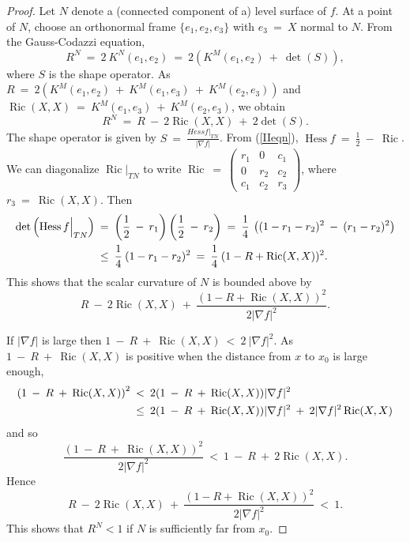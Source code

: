 \documentclass[12pt]{amsart}
\newcommand{\Hess}{\operatorname{Hess}}
\newcommand{\Ric}{\operatorname{Ric}}
\numberwithin{equation}{section}
\theoremstyle{plain}
\theoremstyle{definition}
\theoremstyle{remark}
\begin{document}
\begin{proof}
Let $N$ denote a (connected component of a) 
level surface of $f$. At a point of $N$,
choose an orthonormal frame
$\{e_1, e_2, e_3\}$ with $e_3 \: = \: X$ normal to $N$.
From the Gauss-Codazzi equation, 
\begin{equation}
R^N \: = \: 2 \: K^N(e_1, e_2)
\: = \: 2 (K^M(e_1, e_2) \: + \: \det(S)),
\end{equation}
where $S$ is the shape operator. As
$R \: = \: 2 (K^M(e_1, e_2) \: + \: K^M(e_1, e_3) \: + \:
K^M(e_2, e_3))$ and
$\Ric(X, X) \: = \: K^M(e_1, e_3) \: + \:
K^M(e_2, e_3)$, we obtain
\begin{equation}
R^N \: = \: R \: - \: 2 \Ric(X, X) \: + \: 2 \det(S).
\end{equation}
The shape operator is given by 
$S \: = \: \frac{Hess f |_{TN}}{|\nabla f|}$. 
From (\ref{IIeqn}),
$\Hess f \: = \: \frac{1}{2} \: - \: \Ric$. We can
diagonalize $\Ric \Big|_{TN}$ to write
$\Ric \: = \:
\begin{pmatrix}
r_1 & 0 & c_1 \\
0 & r_2 & c_2 \\
c_1 & c_2 & r_3
\end{pmatrix}$, where $r_3 \: = \: \Ric(X, X)$. Then
\begin{align}
\det \left( \Hess f \Big|_{TN} \right) \: & = \: 
\left( \frac{1}{2} \: - \: r_1 \right) \left( \frac{1}{2} \: - \: r_2 \right)
\: = \: 
\frac{1}{4} \: \left( (1 - r_1 - r_2)^2 \: - \: (r_1 - r_2)^2 \right)
\\
& \le \: \frac{1}{4} \: (1 - r_1 - r_2)^2
\:  = \:
\frac{1}{4} \: (1 - R + \Ric(X, X))^2. \notag
\end{align}
This shows that the scalar curvature of $N$ is bounded above by
\begin{equation}
R \: - \: 2 \Ric(X, X) \: + \: \frac{(1-R+\Ric(X, X))^2}{2|\nabla f|^2}.
\end{equation}

If $|\nabla f|$ is large then
$1 \: - \: R \: + \: \Ric(X, X) \: < \: 2 \: |\nabla f|^2$. 
As $1 \: - \: R \: + \: \Ric(X, X)$ is positive when the
distance from $x$ to $x_0$ is large enough,
\begin{align}
\left( 1 \: - \: R \: + \: \Ric(X, X) \right)^2 \: & < \:
2 (1 \: - \: R \: + \: \Ric(X, X)) |\nabla f|^2 \\
& \le \:
2 (1 \: - \: R \: + \: \Ric(X, X)) |\nabla f|^2 \: + \:
2 |\nabla f|^2 \Ric(X, X) \notag
\end{align}
and so
\begin{equation}
\frac{\left( 1 \: - \: R \: + \: \Ric(X, X) \right)^2}{2|\nabla f|^2}
 \: < \:
1 \: - \: R \: + \: 2 \Ric(X, X).
\end{equation}
Hence
\begin{equation}
R \: - \: 2 \Ric(X, X) \: + \: \frac{(1-R+\Ric(X, X))^2}{2|\nabla f|^2}
\: < \: 1.
\end{equation}
This shows that $R^N < 1$ if $N$ is sufficiently far from $x_0$.


\end{proof}
\end{document}
